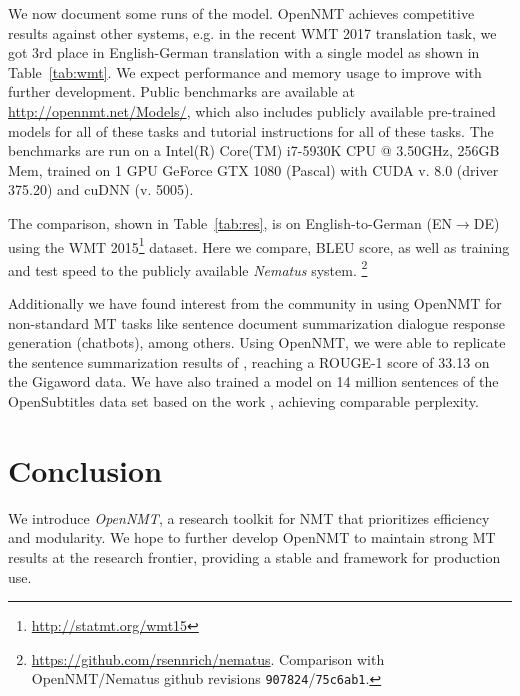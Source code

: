 \documentclass[]{article}
\begin{document}
We now document some runs of the model. OpenNMT achieves competitive results against other systems, e.g. in the recent WMT 2017 translation task, we got 3rd place in English-German translation with a single model as shown in Table~\ref{tab:wmt}. We expect performance and
memory usage to improve with further development.  Public benchmarks
are available at \url{http://opennmt.net/Models/}, which also includes
publicly available pre-trained models for all of these tasks and
tutorial instructions for all of these tasks. The benchmarks are
run on a Intel(R) Core(TM) i7-5930K CPU @ 3.50GHz, 256GB Mem,
trained on 1 GPU GeForce GTX 1080 (Pascal) with CUDA v. 8.0 (driver
375.20) and cuDNN (v. 5005).

The comparison, shown in Table~\ref{tab:res}, is on English-to-German
(EN$\rightarrow$DE) using the WMT
2015\footnote{\url{http://statmt.org/wmt15}} dataset. Here we compare,
BLEU score, as well as training and test speed to the publicly
available \textit{Nematus} system. 
\footnote{\url{https://github.com/rsennrich/nematus}. Comparison with
  OpenNMT/Nematus github revisions {\tt 907824}/{\tt 75c6ab1}.}


Additionally we have found interest from the community in using
OpenNMT for non-standard MT tasks like sentence document summarization
dialogue response generation (chatbots), among others.  Using
OpenNMT, we were able to replicate the sentence summarization results
of \citet{chopra2016abstractive}, reaching a ROUGE-1 score of 33.13 on
the Gigaword data. We have also trained a model on 14 million
sentences of the OpenSubtitles data set based on the work
\citet{vinyals2015neural}, achieving comparable perplexity.













\section{Conclusion}

We introduce \textit{OpenNMT}, a research toolkit for NMT that
prioritizes efficiency and modularity. We hope to further develop
OpenNMT to maintain strong MT results at the research frontier, 
providing a stable and framework for production use.
\newpage
\small



\end{document}
